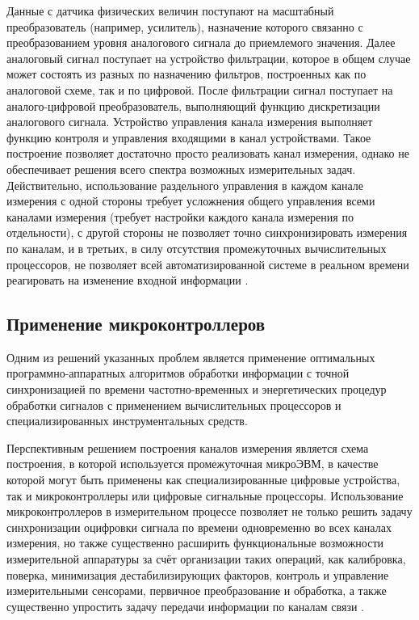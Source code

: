 \documentclass[a4paper, 14pt, titlepage]{extarticle}
\begin{document}
  Данные с датчика физических величин поступают на масштабный преобразователь (например, усилитель),
  назначение которого связанно с преобразованием уровня аналогового сигнала до приемлемого значения.
  Далее аналоговый сигнал поступает на устройство фильтрации, которое в общем случае может состоять
  из разных по назначению фильтров, построенных как по аналоговой схеме, так и по цифровой. После
  фильтрации сигнал поступает на аналого-цифровой преобразователь, выполняющий
  функцию дискретизации аналогового сигнала. Устройство управления канала измерения
  выполняет функцию контроля и управления входящими в канал устройствами. Такое построение позволяет
  достаточно просто реализовать канал измерения, однако не обеспечивает решения всего спектра
  возможных измерительных задач. Действительно, использование раздельного управления в каждом канале
  измерения с одной стороны требует усложнения общего управления всеми каналами измерения (требует
  настройки каждого канала измерения по отдельности), с другой стороны не позволяет точно
  синхронизировать измерения по каналам, и в третьих, в силу отсутствия промежуточных вычислительных
  процессоров, не позволяет всей автоматизированной системе в реальном времени реагировать на
  изменение входной информации \cite{stupin-methods}.

  \subsection{Применение микроконтроллеров}

  Одним из решений указанных проблем является применение оптимальных программно-аппаратных
  алгоритмов обработки информации с точной синхронизацией по времени частотно-временных и
  энергетических процедур обработки сигналов с применением вычислительных процессоров и
  специализированных инструментальных средств.

  Перспективным решением построения каналов измерения является схема построения, в которой
  используется промежуточная микроЭВМ, в качестве которой могут быть применены как
  специализированные цифровые устройства, так и микроконтроллеры или цифровые сигнальные процессоры.
  Использование микроконтроллеров в измерительном процессе позволяет не только решить задачу
  синхронизации оцифровки сигнала по времени одновременно во всех каналах измерения, но также
  существенно расширить функциональные возможности измерительной аппаратуры за счёт организации
  таких операций, как калибровка, поверка, минимизация дестабилизирующих факторов, контроль и
  управление измерительными сенсорами, первичное преобразование и обработка, а также существенно
  упростить задачу передачи информации по каналам связи \cite{klaassen-methods}.
\end{document}
